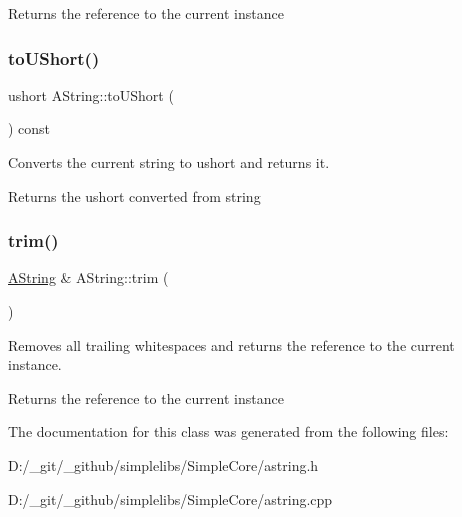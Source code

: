 \begin{DoxyReturn}{Returns}
the reference to the current instance 
\end{DoxyReturn}
\mbox{\label{class_a_string_a4540c5503000d2f399617920055de7a4}} 
\subsubsection{\texorpdfstring{toUShort()}{toUShort()}}
{\footnotesize\ttfamily ushort A\+String\+::to\+U\+Short (\begin{DoxyParamCaption}{ }\end{DoxyParamCaption}) const}



Converts the current string to ushort and returns it. 

\begin{DoxyReturn}{Returns}
the ushort converted from string 
\end{DoxyReturn}
\mbox{\label{class_a_string_a2ba7d2ba7eb61998453f7e7ce364d441}} 
\subsubsection{\texorpdfstring{trim()}{trim()}}
{\footnotesize\ttfamily \mbox{\hyperlink{class_a_string}{A\+String}} \& A\+String\+::trim (\begin{DoxyParamCaption}{ }\end{DoxyParamCaption})}



Removes all trailing whitespaces and returns the reference to the current instance. 

\begin{DoxyReturn}{Returns}
the reference to the current instance 
\end{DoxyReturn}


The documentation for this class was generated from the following files\+:\begin{DoxyCompactItemize}
\item 
D\+:/\+\_\+git/\+\_\+github/simplelibs/\+Simple\+Core/astring.\+h\item 
D\+:/\+\_\+git/\+\_\+github/simplelibs/\+Simple\+Core/astring.\+cpp\end{DoxyCompactItemize}
